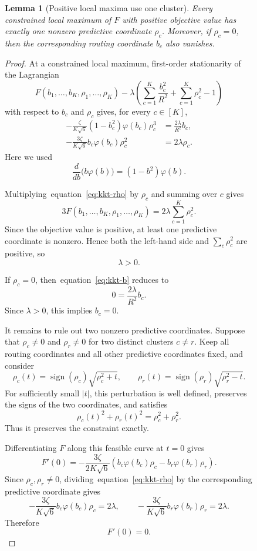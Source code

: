 \documentclass{article}
\def\eqref#1{equation~\ref{#1}}
\newtheorem{lemma}[lemma]{Lemma}
\begin{document}
\begin{figure}
\begin{lemma}[Positive local maxima use one cluster]
Every constrained local maximum of $F$ with positive objective value has
exactly one nonzero predictive coordinate $\rho_c$. Moreover, if
$\rho_c=0$, then the corresponding routing coordinate $b_c$ also vanishes.
\end{lemma}

\begin{proof}
At a constrained local maximum, first-order stationarity of the Lagrangian
\[
    F(b_1,\ldots,b_K,\rho_1,\ldots,\rho_K)
    -
    \lambda\left(
        \sum_{c=1}^K\frac{b_c^2}{R^2}
        +
        \sum_{c=1}^K\rho_c^2
        -1
    \right)
\]
with respect to $b_c$ and $\rho_c$ gives, for every $c\in[K]$,
\begin{align}
    -\frac{\zeta}{K\sqrt6}
    (1-b_c^2)\varphi(b_c)\rho_c^3
    &=
    \frac{2\lambda}{R^2}b_c,
    \label{eq:kkt-b}\tag{B.1}\\
    -\frac{3\zeta}{K\sqrt6}
    b_c\varphi(b_c)\rho_c^2
    &=
    2\lambda\rho_c.
    \label{eq:kkt-rho}\tag{B.2}
\end{align}
Here we used
\[
    \frac{d}{db}\bigl(b\varphi(b)\bigr)
    =
    (1-b^2)\varphi(b).
\]

Multiplying~\eqref{eq:kkt-rho} by $\rho_c$ and summing over $c$ gives
\[
    3F(b_1,\ldots,b_K,\rho_1,\ldots,\rho_K)
    =
    2\lambda\sum_{c=1}^K\rho_c^2.
\]
Since the objective value is positive, at least one predictive coordinate
is nonzero. Hence both the left-hand side and
$\sum_c\rho_c^2$ are positive, so
\[
    \lambda>0.
\]

If $\rho_c=0$, then~\eqref{eq:kkt-b} reduces to
\[
    0=\frac{2\lambda}{R^2}b_c.
\]
Since $\lambda>0$, this implies $b_c=0$.

It remains to rule out two nonzero predictive coordinates. Suppose that
$\rho_c\neq0$ and $\rho_r\neq0$ for two distinct clusters $c\neq r$.
Keep all routing coordinates and all other predictive coordinates fixed,
and consider
\[
    \rho_c(t)
    =
    \operatorname{sign}(\rho_c)
    \sqrt{\rho_c^2+t},
    \qquad
    \rho_r(t)
    =
    \operatorname{sign}(\rho_r)
    \sqrt{\rho_r^2-t}.
\]
For sufficiently small $|t|$, this perturbation is well defined, preserves
the signs of the two coordinates, and satisfies
\[
    \rho_c(t)^2+\rho_r(t)^2
    =
    \rho_c^2+\rho_r^2.
\]
Thus it preserves the constraint exactly.

Differentiating $F$ along this feasible curve at $t=0$ gives
\[
    F'(0)
    =
    -\frac{3\zeta}{2K\sqrt6}
    \left(
        b_c\varphi(b_c)\rho_c
        -
        b_r\varphi(b_r)\rho_r
    \right).
\]
Since $\rho_c,\rho_r\neq0$, dividing~\eqref{eq:kkt-rho} by the corresponding
predictive coordinate gives
\[
    -\frac{3\zeta}{K\sqrt6}
    b_c\varphi(b_c)\rho_c
    =
    2\lambda,
    \qquad
    -\frac{3\zeta}{K\sqrt6}
    b_r\varphi(b_r)\rho_r
    =
    2\lambda.
\]
Therefore
\[
    F'(0)=0.
\]


\end{proof}
\end{figure}
\end{document}
